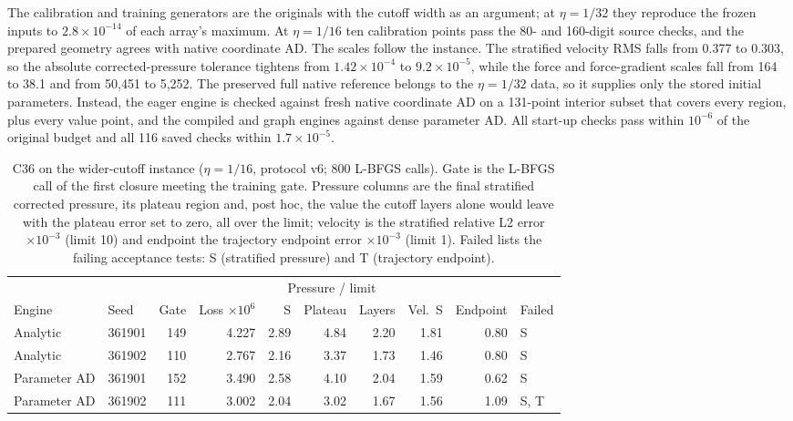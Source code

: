 \documentclass[11pt]{article}
\begin{document}
The calibration and training generators are the originals with the cutoff
width as an argument; at $\eta=1/32$ they reproduce the frozen inputs to
$2.8\times10^{-14}$ of each array's maximum. At $\eta=1/16$ ten calibration
points pass the 80- and 160-digit source checks, and the prepared geometry
agrees with native coordinate AD. The scales follow the instance. The
stratified velocity RMS falls from 0.377 to 0.303, so the absolute
corrected-pressure tolerance tightens from $1.42\times10^{-4}$ to
$9.2\times10^{-5}$, while the force and force-gradient scales fall from 164
to 38.1 and from 50,451 to 5,252. The preserved full native reference
belongs to the $\eta=1/32$ data, so it supplies only the stored initial
parameters. Instead, the eager engine is checked against fresh native
coordinate AD on a 131-point interior subset that covers every region, plus
every value point, and the compiled and graph engines against dense
parameter AD. All start-up checks pass within $10^{-6}$ of the original
budget and all 116 saved checks within $1.7\times10^{-5}$.

\begin{table}[htbp]\centering\small
\setlength{\tabcolsep}{4pt}
\caption{C36 on the wider-cutoff instance ($\eta=1/16$, protocol v6; 800 L-BFGS calls). Gate is the L-BFGS call of the first closure meeting the training gate. Pressure columns are the final stratified corrected pressure, its plateau region and, post hoc, the value the cutoff layers alone would leave with the plateau error set to zero, all over the limit; velocity is the stratified relative L2 error $\times10^{-3}$ (limit 10) and endpoint the trajectory endpoint error $\times10^{-3}$ (limit 1). Failed lists the failing acceptance tests: S (stratified pressure) and T (trajectory endpoint).}
\label{tab:c36v6}
\begin{tabular}{llrrrrrrrl}\toprule
 & & & & \multicolumn{3}{c}{Pressure / limit} & & & \\\cmidrule(lr){5-7}
Engine & Seed & Gate & Loss $\times10^{6}$ & S & Plateau & Layers & Vel.~S & Endpoint & Failed\\\midrule
Analytic & 361901 & 149 & 4.227 & 2.89 & 4.84 & 2.20 & 1.81 & 0.80 & S\\
Analytic & 361902 & 110 & 2.767 & 2.16 & 3.37 & 1.73 & 1.46 & 0.80 & S\\
Parameter AD & 361901 & 152 & 3.490 & 2.58 & 4.10 & 2.04 & 1.59 & 0.62 & S\\
Parameter AD & 361902 & 111 & 3.002 & 2.04 & 3.02 & 1.67 & 1.56 & 1.09 & S, T
\\\bottomrule\end{tabular}
\end{table}
\end{document}
